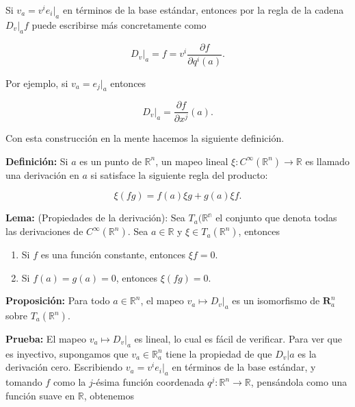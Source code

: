 \documentclass[a4paper,10pt]{article}
\numberwithin{equation}{section}
\newcommand{\definicion}{\textbf{Definición: }}
\newcommand{\lema}{\textbf{Lema: }}
\newcommand{\prueba}{\textbf{Prueba: }}
\newcommand{\proposicion}{\textbf{Proposición: }}
\begin{document}
Si $v_a = v^ie_i|_a$ en términos de la base estándar, entonces por la regla de la 
cadena $D_v|_a f$ puede escribirse más concretamente como 

\begin{equation}
 D_v|_a = f = v^i\frac{\partial f}{\partial q^i (a)}.
\end{equation}

Por ejemplo, si $v_a = e_j|_a$ entonces 

\begin{equation}
 D_v|_a = \frac{\partial f}{\partial x^j}(a).
\end{equation}

Con esta construcción en la mente hacemos la siguiente definición. 

\vspace{.3cm}

\definicion Si $a$ es un punto de $\mathbb{R}^n$, un mapeo lineal
$\xi:C^{\infty}(\mathbb{R}^n) \rightarrow \mathbb{R}$ es llamado una derivación 
en $a$ si satisface la siguiente regla del producto:

\begin{equation}
 \xi(fg) = f(a)\xi g + g(a)\xi f.
\end{equation}

\lema (Propiedades de la derivación): Sea $T_a(\mathbb{R^n}$ el conjunto que denota todas las derivaciones de $C^{\infty}(\mathbb{R}^n)$.
Sea $a \in \mathbb{R}$ y $\xi \in T_a(\mathbb{R}^n)$, entonces 

\begin{enumerate}[label=(\alph*)]
 \item Si $f$ es una función constante, entonces $\xi f = 0$.
 \item Si $f(a) = g(a) = 0$, entonces $\xi(fg) = 0$. 
\end{enumerate}

\proposicion Para todo $a \in \mathbb{R}^n$, el mapeo $v_a \mapsto D_v|_a$ es 
un isomorfismo de $\mathbf{R}^n_a$ sobre $T_a(\mathbb{R}^n)$.

\vspace{.3cm}

\prueba El mapeo  $v_a \mapsto D_v|_a$ es lineal, lo cual es fácil de verificar. 
Para ver que es inyectivo, supongamos que $v_a \in \mathbb{R}^n_a$ tiene 
la propiedad de que $D_v|a$ es la derivación cero. Escribiendo $v_a = v^ie_i|_a$
en términos de la base estándar, y tomando $f$ como la $j$-ésima función 
coordenada $q^j: \mathbb{R}^n \rightarrow \mathbb{R}$, pensándola como 
una función suave en $\mathbb{R}$, obtenemos 
\end{document}
